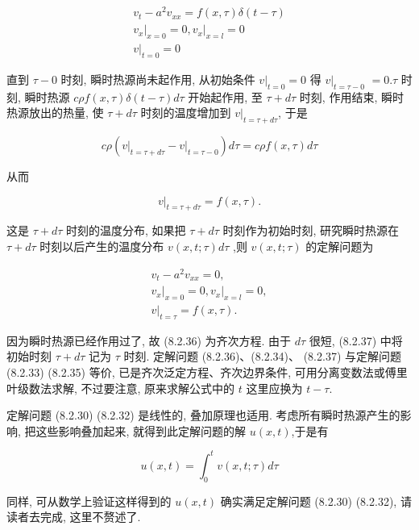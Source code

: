 $$
\begin{gathered}
v_{t}-a^{2} v_{x x}=f(x, \tau) \delta(t-\tau) \\
\left.v_{x}\right|_{x=0}=0,\left.v_{x}\right|_{x=l}=0 \\
\left.v\right|_{t=0}=0
\end{gathered}
$$

直到 $\tau-0$ 时刻, 瞬时热源尚未起作用, 从初始条件 $\left.v\right|_{t=0}=0$ 得 $\left.v\right|_{t=\tau-0}$
$=0 . \tau$ 时刻, 瞬时热源 $c \rho f(x, \tau) \delta(t-\tau) d \tau$ 开始起作用, 至 $\tau+d \tau$ 时刻, 作用结束, 瞬时热源放出的热量, 使 $\tau+d \tau$ 时刻的温度增加到 $\left.v\right|_{t=\tau+d \tau}$, 于是

$$
c \rho\left(\left.v\right|_{t=\tau+d \tau}-\left.v\right|_{t=\tau-0}\right) d \tau=c \rho f(x, \tau) d \tau
$$

从而

$$
\left.v\right|_{t=\tau+d \tau}=f(x, \tau) .
$$

这是 $\tau+d \tau$ 时刻的温度分布, 如果把 $\tau+d \tau$ 时刻作为初始时刻, 研究瞬时热源在 $\tau+d \tau$ 时刻以后产生的温度分布 $v(x, t ; \tau) d \tau$ ,则 $v(x, t ; \tau)$ 的定解问题为

$$
\begin{gathered}
v_{t}-a^{2} v_{x x}=0, \\
\left.v_{x}\right|_{x=0}=0,\left.v_{x}\right|_{x=l}=0, \\
\left.v\right|_{t=\tau}=f(x, \tau) .
\end{gathered}
$$

因为瞬时热源已经作用过了, 故 (8.2.36) 为齐次方程. 由于 $d \tau$ 很短, (8.2.37) 中将初始时刻 $\tau+d \tau$ 记为 $\tau$ 时刻. 定解问题 (8.2.36)、(8.2.34)、 (8.2.37) 与定解问题 (8.2.33) (8.2.35) 等价, 已是齐次泛定方程、齐次边界条件, 可用分离变数法或傅里叶级数法求解, 不过要注意, 原来求解公式中的 $t$ 这里应换为 $t-\tau$.

定解问题 (8.2.30) (8.2.32) 是线性的, 叠加原理也适用. 考虑所有瞬时热源产生的影响, 把这些影响叠加起来, 就得到此定解问题的解 $u(x, t)$,于是有

$$
u(x, t)=\int_{0}^{t} v(x, t ; \tau) d \tau
$$

同样, 可从数学上验证这样得到的 $u(x, t)$ 确实满足定解问题 (8.2.30) (8.2.32), 请读者去完成, 这里不赘述了.